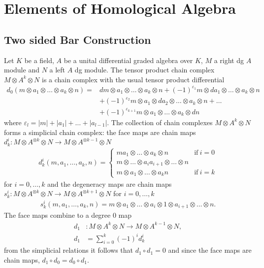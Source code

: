 \documentclass{scrartcl}
\theoremstyle{plain}
\theoremstyle{definition}
\renewcommand{\epsilon}{\varepsilon}
\newcommand{\abs}[1]{\left\lvert#1\right\rvert}
\newcommand{\comp}{\mathbin{\circ}}
\begin{document}
\section{Elements of Homological Algebra}

\subsection{Two sided Bar Construction}\label{subsec:bar_construction}
Let $K$ be a field, $A$ be a unital differential graded algebra over $K$, $M$ a right dg $A$ module and $N$ a left $A$ dg module. The tensor product chain complex $M\otimes A^{k}\otimes N$ is a chain complex with the usual tensor product differential 
\begin{align*}
    d_0(m\otimes a_1\otimes \dots\otimes  a_k\otimes  n) = &dm\otimes a_1\otimes \dots\otimes a_k\otimes n+(-1)^{\epsilon_1}m\otimes da_1\otimes \dots\otimes a_k\otimes n\\&+(-1)^{\epsilon_2}m\otimes a_1\otimes da_2\otimes \dots\otimes a_k\otimes n + \dots \\&+ (-1)^{\epsilon_{k+1}}m\otimes a_1\otimes \dots\otimes a_k\otimes dn
\end{align*}
where $\epsilon_l = \abs{m}+\abs{a_1}+\dots+\abs{a_{l-1}}$. The collection of chain complexes $M\otimes A^k\otimes N$ forms a simplicial chain complex: the face maps are chain maps $d^i_k\colon M\otimes A^{\otimes k}\otimes N\to M\otimes A^{\otimes {k-1}}\otimes N$ 
\begin{align*}
    d^i_k(m, a_1, \dots, a_k, n) = \begin{cases}ma_1\otimes\dots\otimes a_k\otimes n & \text{if}\ i=0\\
    m\otimes \dots\otimes a_ia_{i+1}\otimes \dots\otimes n\\
    m\otimes a_1\otimes\dots\otimes a_k n & \text{if}\ i=k
\end{cases}
\end{align*}
for $i=0,\dots, k$ and the degeneracy maps are chain maps $s^i_k\colon M\otimes A^{\otimes k}\otimes N\to M\otimes A^{\otimes {k+1}}\otimes N$ for $i=0, \dots, k$
\begin{align*}
    s^i_k(m, a_1,\dots, a_k, n) = m\otimes a_1\otimes\dots\otimes a_i\otimes 1\otimes a_{i+1}\otimes\dots\otimes n.
\end{align*}
The face maps combine to a degree $0$ map
\begin{align*}
    d_1&\colon M\otimes A^{k}\otimes N\to M\otimes A^{k-1}\otimes N, \\
    d_1& = \sum_{i=0}^k (-1)^i d_k^i
\end{align*} 
 from the simplicial relations it follows that $d_1\comp d_1 = 0$ and since the face maps are chain maps, $d_1 \comp d_0 = d_0\comp d_1$. 
\end{document}
